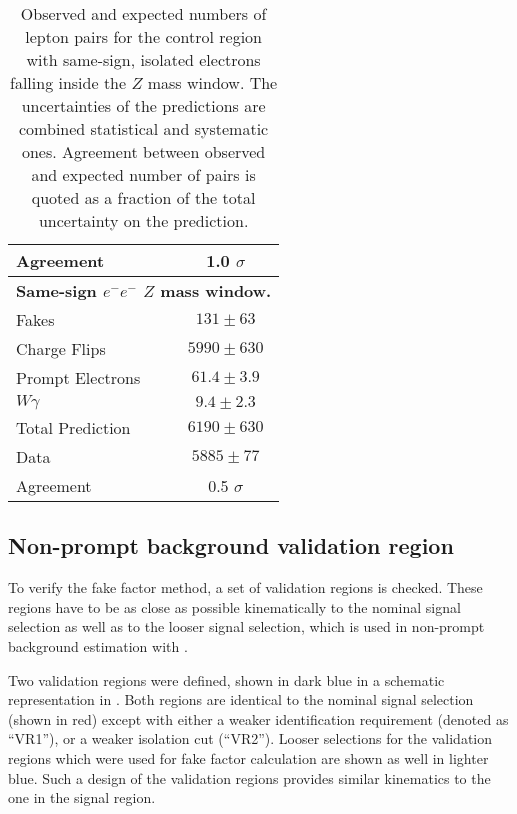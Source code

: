 \begin{table}[htbp]
\begin{center}
\begin{tabular}{l|c}
            \hline
        Agreement  &     1.0 $\sigma$ \\[+0.05in]
%
\hline \hline
\multicolumn{2}{c}{\textbf{Same-sign $e^{-}e^{-}$ $Z$ mass window.}} \\\hline 
        Fakes      & $131 \pm 63$ \\[+0.05in]
        Charge Flips & $5990 \pm 630$ \\[+0.05in]
        Prompt Electrons & $61.4 \pm 3.9$ \\[+0.05in]
        $W\gamma$  & $9.4 \pm 2.3$ \\[+0.05in]
            \hline
        Total Prediction & $6190 \pm 630$ \\[+0.05in]
            \hline
        Data       &        $5885 \pm 77$ \\[+0.05in]
            \hline
        Agreement  &     0.5 $\sigma$ \\[+0.05in]
\hline 
\end{tabular}
\end{center}
\caption{Observed and expected numbers of lepton pairs for the control region with same-sign, isolated electrons falling inside the $Z$ mass window. 
The uncertainties of the predictions are combined statistical and systematic ones.
Agreement between observed and expected number of pairs is quoted as a fraction of the total uncertainty on the prediction.
}
\label{tab:ee_isoSS_Z}
\end{table}


\subsection{Non-prompt background validation region}
\label{subsec:fake_validation}

To verify the fake factor method, a set of validation regions is checked. 
These regions have to be as close as possible kinematically to
the nominal signal selection as well as to the looser signal selection, 
which is used in non-prompt background estimation with .

Two validation regions were defined, shown in dark blue in a schematic representation in . 
Both regions are identical to the nominal signal selection (shown in red) 
except with either a weaker identification requirement (denoted as ``VR1''), or a weaker isolation cut (``VR2'').
Looser selections for the validation regions which were used for fake factor calculation are shown as well in lighter blue. Such a design of the validation regions provides similar kinematics to the one in the signal region.

